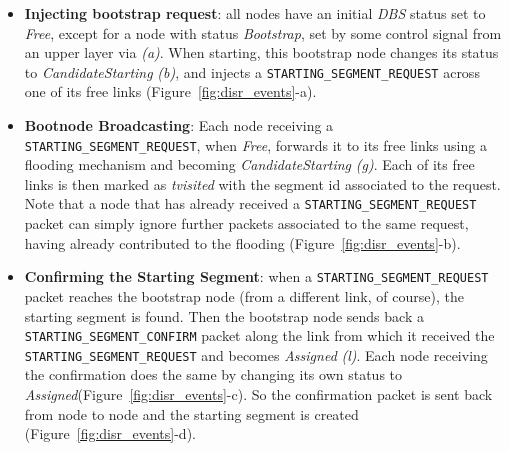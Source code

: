 \begin{itemize}
\item{\textbf{Injecting bootstrap request}}: all nodes have an initial
\emph{DBS} status set to \emph{Free}, except for a
 node with status \emph{Bootstrap}, set by some control signal from an
upper layer via \emph{(a)}. When starting, this bootstrap node 
changes its status to \emph{CandidateStarting} \emph{(b)}, and injects a
\texttt{STARTING\_SEGMENT\_REQUEST} across one of its free links
(Figure~\ref{fig:disr_events}-a). 

\item{\textbf{Bootnode Broadcasting}}: Each node receiving a \texttt{STARTING\_SEGMENT\_REQUEST},
when \emph{Free}, forwards it to its free links using a flooding mechanism and
becoming \emph{CandidateStarting} \emph{(g)}.
Each of its free links is then marked as \emph{tvisited} with the segment id
associated to the request. Note that a node that has already received a
\texttt{STARTING\_SEGMENT\_REQUEST} packet can simply ignore further packets
associated to the same request, having already contributed to the
flooding (Figure~\ref{fig:disr_events}-b).

\item{\textbf{Confirming the Starting Segment}}: when a \texttt{STARTING\_SEGMENT\_REQUEST} packet reaches
the bootstrap node (from a different link, of course), the starting
segment is found. Then the bootstrap node sends back a \texttt{STARTING\_SEGMENT\_CONFIRM}
packet along the link from which it received the
\texttt{STARTING\_SEGMENT\_REQUEST} and becomes \emph{Assigned} \emph{(l)}. Each
node receiving the confirmation does the same by changing its own status
to \emph{Assigned}(Figure~\ref{fig:disr_events}-c). So the confirmation packet is sent back from
node to node and the starting segment is created (Figure~\ref{fig:disr_events}-d). 





\end{itemize}
